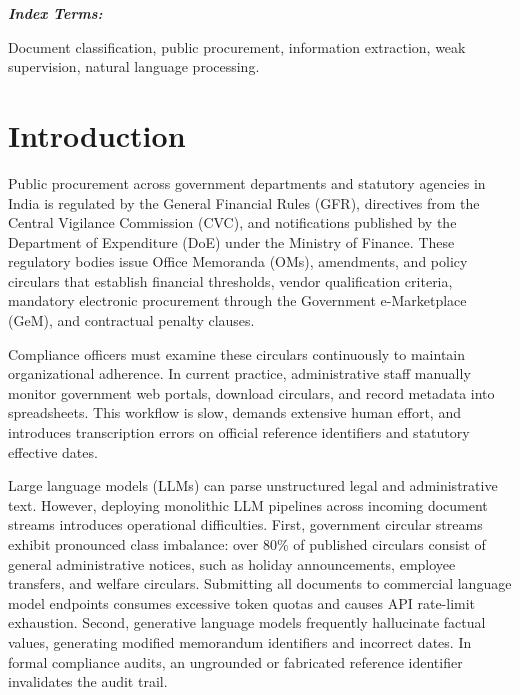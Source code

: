 \documentclass[conference]{IEEEtran}
\renewenvironment{IEEEkeywords}{%
  \par\vspace{0.8ex}\noindent\textbf{\textit{Index Terms:}}\hspace{0.5em}\bfseries\small\ignorespaces%
}{%
  \par\vspace{1.5ex}%
}
\begin{document}
\begin{IEEEkeywords}
Document classification, public procurement, information extraction, weak supervision, natural language processing.
\end{IEEEkeywords}

\section{Introduction}

Public procurement across government departments and statutory agencies in India is regulated by the General Financial Rules (GFR), directives from the Central Vigilance Commission (CVC), and notifications published by the Department of Expenditure (DoE) under the Ministry of Finance. These regulatory bodies issue Office Memoranda (OMs), amendments, and policy circulars that establish financial thresholds, vendor qualification criteria, mandatory electronic procurement through the Government e-Marketplace (GeM), and contractual penalty clauses.

Compliance officers must examine these circulars continuously to maintain organizational adherence. In current practice, administrative staff manually monitor government web portals, download circulars, and record metadata into spreadsheets. This workflow is slow, demands extensive human effort, and introduces transcription errors on official reference identifiers and statutory effective dates.

Large language models (LLMs) can parse unstructured legal and administrative text. However, deploying monolithic LLM pipelines across incoming document streams introduces operational difficulties. First, government circular streams exhibit pronounced class imbalance: over 80\% of published circulars consist of general administrative notices, such as holiday announcements, employee transfers, and welfare circulars. Submitting all documents to commercial language model endpoints consumes excessive token quotas and causes API rate-limit exhaustion. Second, generative language models frequently hallucinate factual values, generating modified memorandum identifiers and incorrect dates. In formal compliance audits, an ungrounded or fabricated reference identifier invalidates the audit trail.
\end{document}

